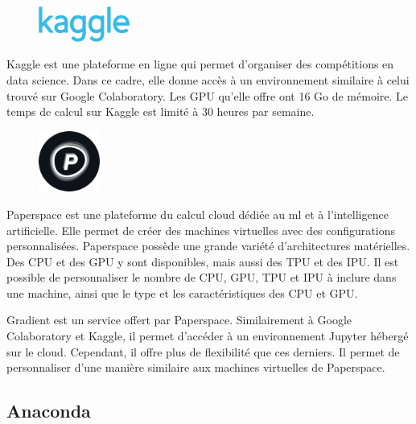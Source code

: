 \begin{figure}
    \vspace*{-\topsep}
    \begin{flushright}
        \includegraphics[width=3cm]{assets/images/Kaggle_logo.png}
    \end{flushright}
\end{figure}
Kaggle est une plateforme en ligne qui permet d'organiser des compétitions en data science.
Dans ce cadre, elle donne accès à un environnement similaire à celui trouvé sur Google Colaboratory.
Les GPU qu'elle offre ont 16 Go de mémoire.
Le temps de calcul sur Kaggle est limité à 30 heures par semaine.


\begin{figure}
    \vspace*{-\topsep}
    \begin{flushright}
        \includegraphics[width=2cm]{assets/images/paperspace.png}
    \end{flushright}
\end{figure}
Paperspace est une plateforme du calcul cloud dédiée au \gls{ml} et à l'intelligence artificielle.
Elle permet de créer des machines virtuelles avec des configurations personnalisées.
Paperspace possède une grande variété d'architectures matérielles.
Des CPU et des GPU y sont disponibles, mais aussi des TPU et des IPU.
Il est possible de personnaliser le nombre de CPU, GPU, TPU et IPU à inclure dans une  machine,
ainsi que le type et les caractéristiques des CPU et GPU.

Gradient est un service offert par Paperspace.
Similairement à Google Colaboratory et Kaggle, il permet d'accéder à un environnement Jupyter hébergé sur le cloud.
Cependant, il offre plus de flexibilité que ces derniers.
Il permet de personnaliser d'une manière similaire aux machines virtuelles de Paperspace.
\ \\

\subsection{Anaconda}%
\label{subsec.anaconda}


